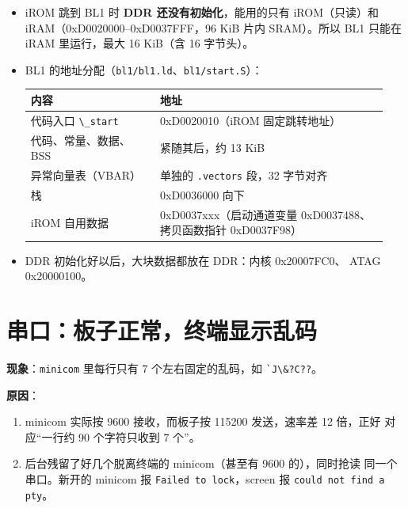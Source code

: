 \begin{itemize}
\item
  iROM 跳到 BL1 时 \textbf{DDR 还没有初始化}，能用的只有 iROM（只读）和
  iRAM（0xD0020000--0xD0037FFF，96 KiB 片内 SRAM）。所以 BL1 只能在 iRAM
  里运行，最大 16 KiB（含 16 字节头）。
\item
  BL1
  的地址分配（\passthrough{\lstinline!bl1/bl1.ld!}、\passthrough{\lstinline!bl1/start.S!}）：

  {\def\LTcaptype{none} %
  \begin{longtable}[]{@{}p{0.34\linewidth}p{0.60\linewidth}@{}}
  \toprule\noalign{}
  内容 & 地址 \\
  \midrule\noalign{}
  \endhead
  \bottomrule\noalign{}
  \endlastfoot
  代码入口 \passthrough{\lstinline!\_start!} & 0xD0020010（iROM
  固定跳转地址） \\
  代码、常量、数据、BSS & 紧随其后，约 13 KiB \\
  异常向量表（VBAR） & 单独的 \passthrough{\lstinline!.vectors!} 段，32
  字节对齐 \\
  栈 & 0xD0036000 向下 \\
  iROM 自用数据 & 0xD0037xxx（启动通道变量 0xD0037488、拷贝函数指针
  0xD0037F98） \\
  \end{longtable}
  }
\item
  DDR 初始化好以后，大块数据都放在 DDR：内核 0x20007FC0、
  ATAG 0x20000100。
\end{itemize}

\section{串口：板子正常，终端显示乱码}\label{ux4e32ux53e3ux677fux5b50ux6b63ux5e38ux7ec8ux7aefux663eux793aux4e71ux7801}

\textbf{现象}：\passthrough{\lstinline!minicom!} 里每行只有 7
个左右固定的乱码，如 \passthrough{\lstinline!`J\&?C??!}。

\textbf{原因}：

\begin{enumerate}
\def\labelenumi{\arabic{enumi}.}
\tightlist
\item
  minicom 实际按 9600 接收，而板子按 115200 发送，速率差 12 倍，正好
  对应``一行约 90 个字符只收到 7 个''。
\item
  后台残留了好几个脱离终端的 minicom（甚至有 9600 的），同时抢读
  同一个串口。新开的 minicom 报
  \passthrough{\lstinline!Failed to lock!}，screen 报
  \passthrough{\lstinline!could not find a pty!}。
\end{enumerate}

